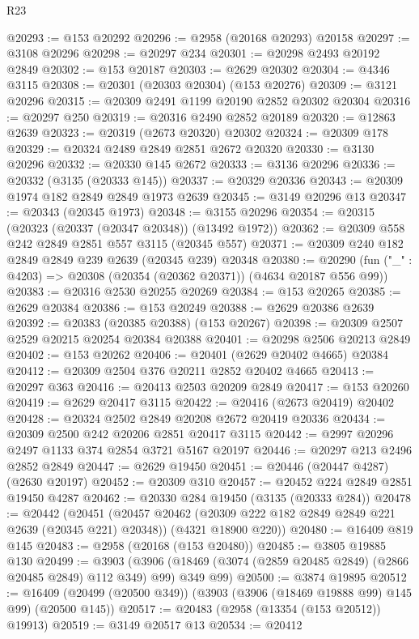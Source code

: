 \begin{lexlean}{R23}
\begin{coremodule}
@20293 := @153 @20292
@20296 := @2958 (@20168 @20293) @20158
@20297 := @3108 @20296
@20298 := @20297 @234
@20301 := @20298 @2493 @20192 @2849
@20302 := @153 @20187
@20303 := @2629 @20302
@20304 := @4346 @3115
@20308 := @20301 (@20303 @20304) (@153 @20276)
@20309 := @3121 @20296
@20315 := @20309 @2491 @1199 @20190 @2852 @20302 @20304
@20316 := @20297 @250
@20319 := @20316 @2490 @2852 @20189
@20320 := @12863 @2639
@20323 := @20319 (@2673 @20320) @20302
@20324 := @20309 @178
@20329 := @20324 @2489 @2849 @2851 @2672 @20320
@20330 := @3130 @20296
@20332 := @20330 @145 @2672
@20333 := @3136 @20296
@20336 := @20332 (@3135 (@20333 @145))
@20337 := @20329 @20336
@20343 := @20309 @1974 @182 @2849 @2849 @1973 @2639
@20345 := @3149 @20296 @13
@20347 := @20343 (@20345 @1973)
@20348 := @3155 @20296
@20354 := @20315 (@20323 (@20337 (@20347 @20348)) (@13492 @1972))
@20362 := @20309 @558 @242 @2849 @2851 @557 @3115 (@20345 @557)
@20371 := @20309 @240 @182 @2849 @2849 @239 @2639 (@20345 @239) @20348
@20380 := @20290 (fun ("_" : @4203) => @20308 (@20354 (@20362 @20371)) (@4634 @20187 @556 @99))
@20383 := @20316 @2530 @20255 @20269
@20384 := @153 @20265
@20385 := @2629 @20384
@20386 := @153 @20249
@20388 := @2629 @20386 @2639
@20392 := @20383 (@20385 @20388) (@153 @20267)
@20398 := @20309 @2507 @2529 @20215 @20254 @20384 @20388
@20401 := @20298 @2506 @20213 @2849
@20402 := @153 @20262
@20406 := @20401 (@2629 @20402 @4665) @20384
@20412 := @20309 @2504 @376 @20211 @2852 @20402 @4665
@20413 := @20297 @363
@20416 := @20413 @2503 @20209 @2849
@20417 := @153 @20260
@20419 := @2629 @20417 @3115
@20422 := @20416 (@2673 @20419) @20402
@20428 := @20324 @2502 @2849 @20208 @2672 @20419 @20336
@20434 := @20309 @2500 @242 @20206 @2851 @20417 @3115
@20442 := @2997 @20296 @2497 @1133 @374 @2854 @3721 @5167 @20197
@20446 := @20297 @213 @2496 @2852 @2849
@20447 := @2629 @19450
@20451 := @20446 (@20447 @4287) (@2630 @20197)
@20452 := @20309 @310
@20457 := @20452 @224 @2849 @2851 @19450 @4287
@20462 := @20330 @284 @19450 (@3135 (@20333 @284))
@20478 := @20442
    (@20451
      (@20457 @20462 (@20309 @222 @182 @2849 @2849 @221 @2639 (@20345 @221) @20348))
      (@4321 @18900 @220))
@20480 := @16409 @819 @145
@20483 := @2958 (@20168 (@153 @20480))
@20485 := @3805 @19885 @130
@20499 := @3903
    (@3906 (@18469 (@3074 (@2859 @20485 @2849) (@2866 @20485 @2849) @112 @349) @99) @349 @99)
@20500 := @3874 @19895
@20512 := @16409 (@20499 (@20500 @349)) (@3903 (@3906 (@18469 @19888 @99) @145 @99) (@20500 @145))
@20517 := @20483 (@2958 (@13354 (@153 @20512)) @19913)
@20519 := @3149 @20517 @13
@20534 := @20412

\end{coremodule}
\end{lexlean}
